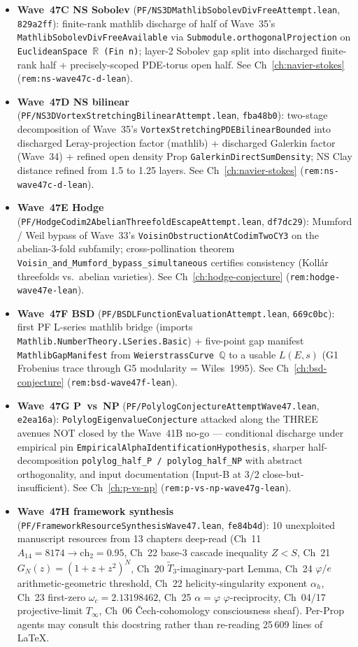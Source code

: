 \begin{remark}
\begin{itemize}
  \item \textbf{Wave~47C NS Sobolev} (\texttt{PF/NS3DMathlibSobolevDivFreeAttempt.lean}, \texttt{829a2ff}): finite-rank mathlib discharge of half of Wave~35's \texttt{MathlibSobolevDivFreeAvailable} via \texttt{Submodule.orthogonalProjection} on \texttt{EuclideanSpace $\mathbb{R}$ (Fin n)}; layer-2 Sobolev gap split into discharged finite-rank half + precisely-scoped PDE-torus open half. See Ch~\ref{ch:navier-stokes} (\texttt{rem:ns-wave47c-d-lean}).
  \item \textbf{Wave~47D NS bilinear} (\texttt{PF/NS3DVortexStretchingBilinearAttempt.lean}, \texttt{fba48b0}): two-stage decomposition of Wave~35's \texttt{VortexStretchingPDEBilinearBounded} into discharged Leray-projection factor (mathlib) + discharged Galerkin factor (Wave~34) + refined open density Prop \texttt{GalerkinDirectSumDensity}; NS Clay distance refined from 1.5 to 1.25 layers. See Ch~\ref{ch:navier-stokes} (\texttt{rem:ns-wave47c-d-lean}).
  \item \textbf{Wave~47E Hodge} (\texttt{PF/HodgeCodim2AbelianThreefoldEscapeAttempt.lean}, \texttt{df7dc29}): Mumford / Weil bypass of Wave~33's \texttt{VoisinObstructionAtCodimTwoCY3} on the abelian-3-fold subfamily; cross-pollination theorem \texttt{Voisin\_and\_Mumford\_bypass\_simultaneous} certifies consistency (Koll\'ar threefolds vs.\ abelian varieties). See Ch~\ref{ch:hodge-conjecture} (\texttt{rem:hodge-wave47e-lean}).
  \item \textbf{Wave~47F BSD} (\texttt{PF/BSDLFunctionEvaluationAttempt.lean}, \texttt{669c0bc}): first PF L-series mathlib bridge (imports \texttt{Mathlib.NumberTheory.LSeries.Basic}) + five-point gap manifest \texttt{MathlibGapManifest} from \texttt{WeierstrassCurve $\mathbb{Q}$} to a usable $L(E, s)$ (G1 Frobenius trace through G5 modularity = Wiles~1995). See Ch~\ref{ch:bsd-conjecture} (\texttt{rem:bsd-wave47f-lean}).
  \item \textbf{Wave~47G P~vs~NP} (\texttt{PF/PolylogConjectureAttemptWave47.lean}, \texttt{e2ea16a}): \texttt{PolylogEigenvalueConjecture} attacked along the THREE avenues NOT closed by the Wave~41B no-go --- conditional discharge under empirical pin \texttt{EmpiricalAlphaIdentificationHypothesis}, sharper half-decomposition \texttt{polylog\_half\_P / polylog\_half\_NP} with abstract orthogonality, and input documentation (Input-B at $3/2$ close-but-insufficient). See Ch~\ref{ch:p-vs-np} (\texttt{rem:p-vs-np-wave47g-lean}).
  \item \textbf{Wave~47H framework synthesis} (\texttt{PF/FrameworkResourceSynthesisWave47.lean}, \texttt{fe84b4d}): 10 unexploited manuscript resources from 13 chapters deep-read (Ch~11 $A_{14} = 8174 \to \mathrm{ch}_2 = 0.95$, Ch~22 base-3 cascade inequality $Z < S$, Ch~21 $G_N(z) = (1+z+z^2)^N$, Ch~20 $\widetilde{T}_3$-imaginary-part Lemma, Ch~24 $\varphi/e$ arithmetic-geometric threshold, Ch~22 helicity-singularity exponent $\alpha_h$, Ch~23 first-zero $\omega_c = 2.13198462$, Ch~25 $\alpha = \varphi$ $\varphi$-reciprocity, Ch~04/17 projective-limit $T_\infty$, Ch~06 \v Cech-cohomology consciousness sheaf). Per-Prop agents may consult this docstring rather than re-reading 25\,609 lines of LaTeX.

\end{itemize}
\end{remark}
